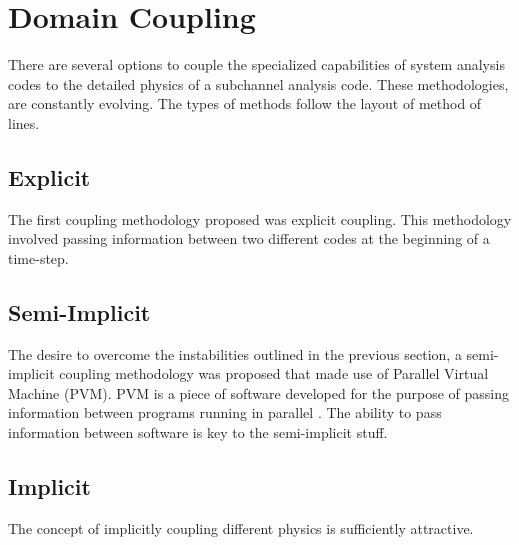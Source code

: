 \section{Domain Coupling}
\label{sect:code_coupling}
There are several options to couple the specialized capabilities of system analysis codes to the detailed physics of a subchannel analysis code.
These methodologies, are constantly evolving.
The types of methods follow the layout of method of lines.

\subsection{Explicit}
\label{subsect:coupling_explicit}
The first coupling methodology proposed was explicit coupling.
This methodology involved passing information between two different codes at the beginning of a time-step.


\subsection{Semi-Implicit}
\label{subsect:coupling_semi_implicit}
The desire to overcome the instabilities outlined in the previous section, a semi-implicit coupling methodology was proposed that made use of Parallel Virtual Machine (PVM).
PVM is a piece of software developed for the purpose of passing information between programs running in parallel \cite{Geist1994}. 
The ability to pass information between software is key to the semi-implicit stuff. 

\subsection{Implicit}
\label{subsect:coupling_implicit}
The concept of implicitly coupling different physics is sufficiently attractive. 

